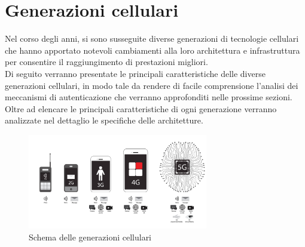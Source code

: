 \chapter{Generazioni cellulari}
Nel corso degli anni, si sono susseguite diverse generazioni di tecnologie cellulari che hanno apportato
notevoli cambiamenti alla loro architettura e infrastruttura per consentire il raggiungimento di prestazioni migliori\cite{architecture-evolution}.\\
Di seguito verranno presentate le principali caratteristiche
delle diverse generazioni cellulari, in modo tale da rendere di facile comprensione l'analisi dei meccanismi
di autenticazione che verranno approfonditi nelle prossime sezioni.\\
Oltre ad elencare le principali caratteristiche di ogni generazione verranno analizzate nel dettaglio le specifiche  
delle architetture.
\begin{figure}[ht]
    \centering
    \includegraphics[width=0.7\textwidth]{images/generations-scheme.jpg}
    \caption{Schema delle generazioni cellulari}
\end{figure}

\clearpage

